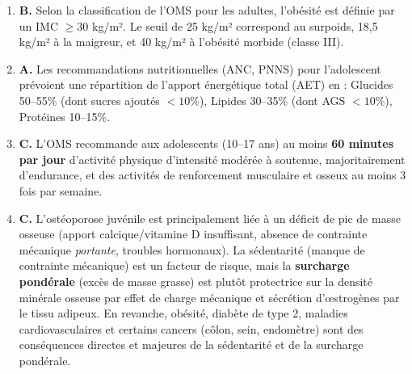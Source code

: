 \documentclass[11pt]{article}
\begin{document}
\begin{corrige}
\begin{enumerate}
\item \textbf{B.} Selon la classification de l'OMS pour les adultes, l'obésité est définie par un IMC $\ge 30$ kg/m². Le seuil de 25 kg/m² correspond au surpoids, 18,5 kg/m² à la maigreur, et 40 kg/m² à l'obésité morbide (classe III).
\item \textbf{A.} Les recommandations nutritionnelles (ANC, PNNS) pour l'adolescent prévoient une répartition de l'apport énergétique total (AET) en : Glucides 50--55\% (dont sucres ajoutés $<10\%$), Lipides 30--35\% (dont AGS $<10\%$), Protéines 10--15\%.
\item \textbf{C.} L'OMS recommande aux adolescents (10--17 ans) au moins \textbf{60 minutes par jour} d'activité physique d'intensité modérée à soutenue, majoritairement d'endurance, et des activités de renforcement musculaire et osseux au moins 3 fois par semaine.
\item \textbf{C.} L'ostéoporose juvénile est principalement liée à un déficit de pic de masse osseuse (apport calcique/vitamine D insuffisant, absence de contrainte mécanique \emph{portante}, troubles hormonaux). La sédentarité (manque de contrainte mécanique) est un facteur de risque, mais la \textbf{surcharge pondérale} (excès de masse grasse) est plutôt protectrice sur la densité minérale osseuse par effet de charge mécanique et sécrétion d'œstrogènes par le tissu adipeux. En revanche, obésité, diabète de type 2, maladies cardiovasculaires et certains cancers (côlon, sein, endomètre) sont des conséquences directes et majeures de la sédentarité et de la surcharge pondérale.
\end{enumerate}
\end{corrige}
\end{document}
